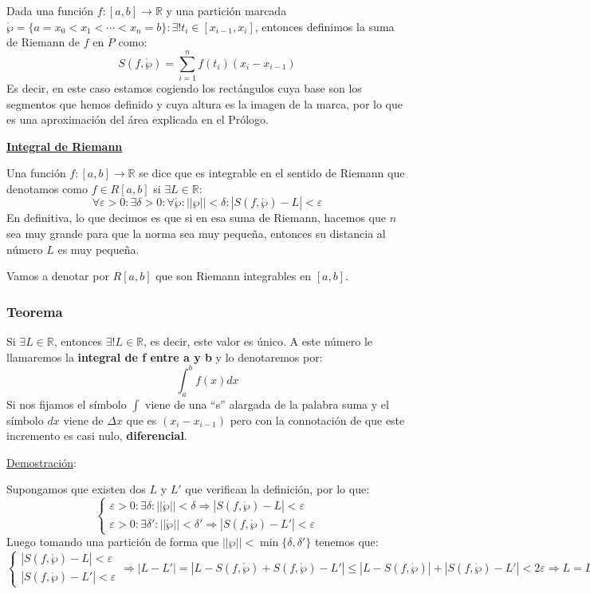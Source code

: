 \documentclass[10pt,a4paper,openright]{book}
\begin{document}
Dada una función $f: [a,b]\rightarrow \mathbb R$ y una partición marcada $\mathring{\wp}=\{a=x_0<x_1<\cdots < x_n = b\}: \exists! t_i\in [x_{i-1}, x_i]$, entonces definimos la suma de Riemann de $f$ en $\mathring{P}$ como:
$$S(f,\mathring{\wp})=\sum_{i=1}^n f(t_i)(x_i-x_{i-1})$$
Es decir, en este caso estamos cogiendo los rectángulos cuya base son los segmentos que hemos definido y cuya altura es la imagen de la marca, por lo que es una aproximación del área explicada en el Prólogo.

\underline{\textbf{Integral de Riemann}}

Una función $f:[a,b]\rightarrow \mathbb R$ se dice que es integrable en el sentido de Riemann que denotamos como $f\in R[a,b]$ si $\exists L\in \mathbb R$:
$$\forall \varepsilon>0: \exists \delta>0: \forall \mathring{\wp}: ||\wp||<\delta: \left|S(f,\mathring{\wp})-L\right|<\varepsilon$$
En definitiva, lo que decimos es que si en esa suma de Riemann, hacemos que $n$ sea muy grande para que la norma sea muy pequeña, entonces su distancia al número $L$ es muy pequeña.

Vamos a denotar por $R[a,b]$ que son Riemann integrables en $[a,b]$.

\subsubsection*{Teorema}
Si $\exists L \in \mathbb R$, entonces $\exists! L\in \mathbb R$, es decir, este valor es único. A este número le llamaremos la \textbf{integral de f entre a y b} y lo denotaremos por:
$$\int_a^b f(x)dx$$
Si nos fijamos el símbolo $\int$ viene de una ``s'' alargada de la palabra suma y el símbolo $dx$ viene de $\Delta x$ que es $(x_i-x_{i-1})$ pero con la connotación de que este incremento es casi nulo, \textbf{diferencial}. 

\underline{Demostración}:

Supongamos que existen dos $L$ y $L'$ que verifican la definición, por lo que:
$$\begin{cases}\varepsilon>0: \exists \delta: ||\mathring{\wp}||<\delta\Rightarrow |S(f,\mathring{\wp})-L|<\varepsilon \\ \varepsilon>0: \exists \delta': ||\mathring{\wp}||<\delta'\Rightarrow |S(f,\mathring{\wp})-L'|<\varepsilon \end{cases}$$
Luego tomando una partición de forma que $||\wp||<\min\{\delta, \delta'\}$ tenemos que:
$$\begin{cases}|S(f,\mathring{\wp})-L|<\varepsilon \\ |S(f,\mathring{\wp})-L'|<\varepsilon\end{cases}\Rightarrow |L-L'|=|L-S(f,\mathring{\wp})+S(f,\mathring{\wp})-L'|\leq |L-S(f,\mathring{\wp})|+|S(f,\mathring{\wp})-L'|<2\varepsilon\Rightarrow L=L'$$
\end{document}
